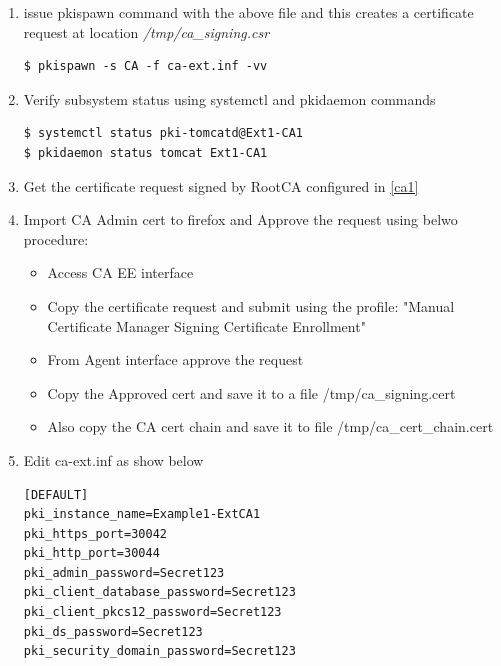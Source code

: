 \documentclass[a4paper]{article}
\begin{document}
\begin{enumerate}[label*=\arabic*.]
\begin{enumerate}[label*=\arabic*.]
\begin{lstlisting}[style=configFile]
[CA]
pki_external=True
pki_external_csr_path=/tmp/ca_signing.csr
pki_ca_signing_subject_dn=cn=CA Signing, ou=External,o=example.org
pki_ds_hostname=pki1.example.org
pki_ds_ldap_port=2389
pki_ds_password=Secret123
pki_ds_secure_connection=False
                        \end{lstlisting}
                    \item \label{ca3.2} issue pkispawn command with the above file and this creates a certificate request at location \textit{/tmp/ca\_signing.csr}
                        \begin{lstlisting}[style=bashInputStyle]
$ pkispawn -s CA -f ca-ext.inf -vv
                        \end{lstlisting}
                    \item Verify subsystem status using systemctl and pkidaemon commands
                    \begin{lstlisting}[style=bashInputStyle]
$ systemctl status pki-tomcatd@Ext1-CA1
$ pkidaemon status tomcat Ext1-CA1
                    \end{lstlisting}
                    \item Get the certificate request signed by RootCA configured in \ref{ca1}
                    \item Import CA Admin cert to firefox and Approve the request using belwo procedure:
                        \begin{itemize}
                            \item Access CA EE interface
                            \item Copy the certificate request and submit using the profile:
                                    "Manual Certificate Manager Signing Certificate Enrollment"
                            \item From Agent interface approve the request
                            \item Copy the Approved cert and save it to a file /tmp/ca\_signing.cert
                            \item Also copy the CA cert chain and save it to file /tmp/ca\_cert\_chain.cert
                        \end{itemize}
                    \item Edit ca-ext.inf as show below
                        \begin{lstlisting}[style=configFile]
[DEFAULT]
pki_instance_name=Example1-ExtCA1
pki_https_port=30042
pki_http_port=30044
pki_admin_password=Secret123
pki_client_database_password=Secret123
pki_client_pkcs12_password=Secret123
pki_ds_password=Secret123
pki_security_domain_password=Secret123


\end{lstlisting}
\end{enumerate}
\end{enumerate}
\end{document}

